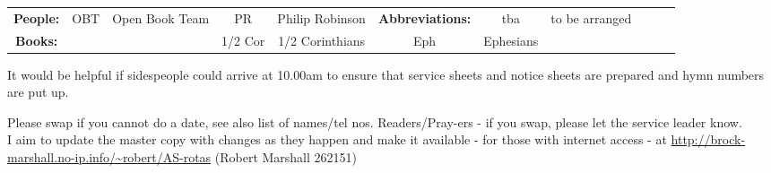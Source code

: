 \documentclass[10pt]{article}
\begin{document}
\begin{center}
\vspace{1em}
\begin{tabular}{|c|c|c|c|c|c|c|c|c|c|c|}\hline
{\bf People: } &
OBT & Open Book Team &
PR & Philip Robinson &
{\bf Abbreviations:}
& tba & to be arranged \\
 {\bf Books: }  &  &   & 1/2 Cor & 1/2 Corinthians
&  Eph & Ephesians & 
\\ %
     \hline
  \end{tabular}
\end{center}
\begin{minipage}{0.7\textwidth}
{\footnotesize It would be helpful if sidespeople 
could arrive at 10.00am to ensure that service sheets and notice sheets are 
prepared and hymn numbers are put up.

Please swap if you cannot do a date, see also list of names/tel nos.
Readers/Pray-ers - if you swap, please let the service leader know.\\
I aim to update the master copy with changes as they
happen and make it available - for those with internet access
\linebreak - at
\url{http://brock-marshall.no-ip.info/~robert/AS-rotas}
(Robert Marshall 262151)}
\end{minipage}
\end{document}
